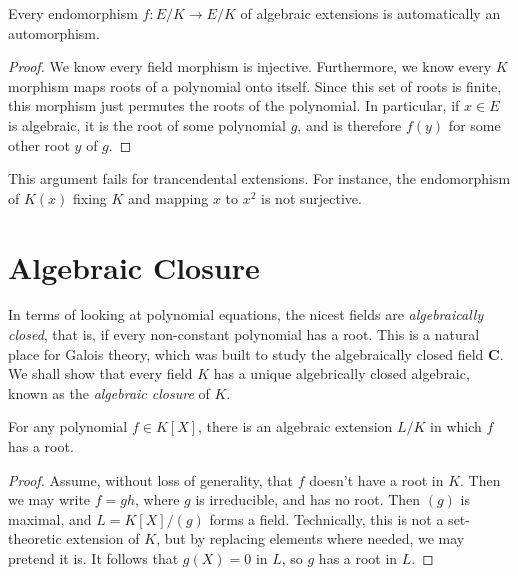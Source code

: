\begin{corollary}
    Every endomorphism $f: E/K \to E/K$ of algebraic extensions is automatically an automorphism.
\end{corollary}
\begin{proof}
	We know every field morphism is injective. Furthermore, we know every $K$ morphism maps roots of a polynomial onto itself. Since this set of roots is finite, this morphism just permutes the roots of the polynomial. In particular, if $x \in E$ is algebraic, it is the root of some polynomial $g$, and is therefore $f(y)$ for some other root $y$ of $g$.
\end{proof}

\begin{remark}
	This argument fails for trancendental extensions. For instance, the endomorphism of $K(x)$ fixing $K$ and mapping $x$ to $x^2$ is not surjective.
\end{remark}

\section{Algebraic Closure}

In terms of looking at polynomial equations, the nicest fields are {\it algebraically closed}, that is, if every non-constant polynomial has a root. This is a natural place for Galois theory, which was built to study the algebraically closed field $\mathbf{C}$. We shall show that every field $K$ has a unique algebrically closed algebraic, known as the {\it algebraic closure} of $K$.

\begin{lemma}
    For any polynomial $f \in K[X]$, there is an algebraic extension $L/K$ in which $f$ has a root.
\end{lemma}
\begin{proof}
    Assume, without loss of generality, that $f$ doesn't have a root in $K$. Then we may write $f = gh$, where $g$ is irreducible, and has no root. Then $(g)$ is maximal, and $L = K[X]/(g)$ forms a field. Technically, this is not a set-theoretic extension of $K$, but by replacing elements where needed, we may pretend it is. It follows that $g(X) = 0$ in $L$, so $g$ has a root in $L$.
\end{proof}

